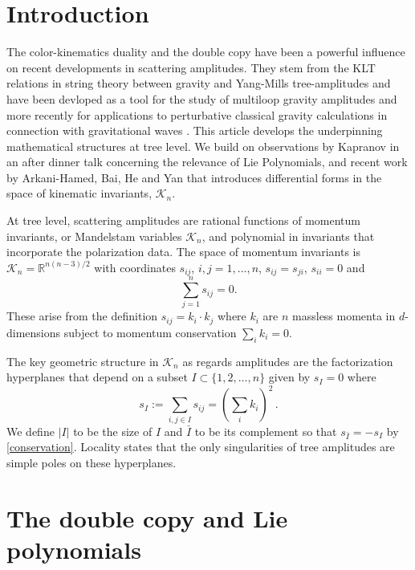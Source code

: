 \documentclass[11pt]{article}
\newcommand{\R}{\mathbb{R}}
\newcommand{\cK}{\mathcal{K}}
\newcommand{\1}{{\rm 1\hskip-0.25em I}}
\begin{document}
\maketitle
\section{Introduction}
The color-kinematics duality and the double copy \cite{Bern:2008qj, Bern:2010ue} have been a powerful influence on recent developments in scattering amplitudes. They stem from the KLT relations in string theory \cite{Kawai:1985xq} between gravity and Yang-Mills tree-amplitudes and have been devloped as a  tool for the study of multiloop gravity amplitudes and more recently for applications to perturbative classical gravity calculations in connection with gravitational waves \cite{Bern:2019prr}.
This article develops the underpinning mathematical structures at tree level.  We  build on observations by Kapranov in an after dinner talk \cite{Kapranov} concerning the relevance of Lie Polynomials, and recent work by Arkani-Hamed, Bai, He and Yan \cite{Arkani-Hamed:2017mur} that introduces differential forms in the space of kinematic invariants, $\cK_n$.

At tree level, scattering amplitudes are rational functions of momentum invariants, or Mandelstam variables $\cK_n$, and polynomial in invariants that incorporate the polarization data.  The space of momentum invariants is $\cK_n=\R^{n(n-3)/2}$ with coordinates $s_{ij}$, $i,j=1,\ldots , n$, $s_{ij}=s_{ji}$, $s_{ii}=0$ and 
\begin{equation}
\sum_{j=1}^n s_{ij} = 0. \label{conservation}
\end{equation}
These arise from  the definition $s_{ij}=k_i\cdot k_j$ where $k_i$ are $n$ massless momenta in $d$-dimensions subject to momentum conservation $\sum_i k_i=0$.

The key geometric structure in $\cK_n$ as regards amplitudes are the factorization hyperplanes that depend on a subset $I\subset \{1,2,\ldots,n\}$ given by $s_I=0$ where\begin{equation}
s_I:=\sum_{i,j\in I} s_{ij}=\left(\sum_i k_i\right)^2\, .
\end{equation}
We define $|I|$ to be the size of $I$ and $\bar I$ to be its complement so that $s_{\bar I}=-s_I$ by \eqref{conservation}. Locality states that the only singularities of tree amplitudes are simple poles on these hyperplanes.



\section{The double copy and Lie polynomials}
\end{document}
